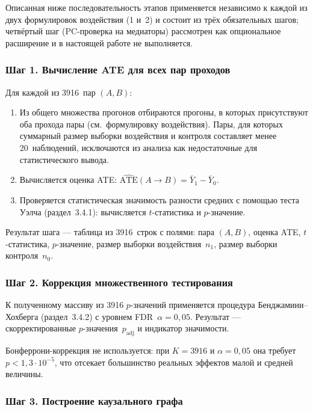 Описанная ниже последовательность этапов применяется независимо к каждой из двух формулировок воздействия (1 и~2) и состоит из трёх обязательных шагов; четвёртый шаг (PC-проверка на медиаторы) рассмотрен как опциональное расширение и в настоящей работе не выполняется.

\subsubsection{Шаг 1. Вычисление ATE для всех пар проходов}

Для каждой из 3916~пар $(A, B)$:

\begin{enumerate}
    \item Из общего множества прогонов отбираются прогоны, в которых присутствуют оба прохода пары (см.~формулировку воздействия). Пары, для которых суммарный размер выборки воздействия и контроля составляет менее 20~наблюдений, исключаются из анализа как недостаточные для статистического вывода.
    \item Вычисляется оценка ATE: $\widehat{\text{ATE}}(A \to B) = \bar{Y}_1 - \bar{Y}_0$.
    \item Проверяется статистическая значимость разности средних с помощью теста Уэлча (раздел~3.4.1): вычисляется $t$-статистика и $p$-значение.
\end{enumerate}

Результат шага --- таблица из 3916~строк с полями: пара $(A, B)$, оценка ATE, $t$-статистика, $p$-значение, размер выборки воздействия~$n_1$, размер выборки контроля~$n_0$.

\subsubsection{Шаг 2. Коррекция множественного тестирования}

К полученному массиву из 3916 $p$-значений применяется процедура Бенджамини--Хохберга (раздел~3.4.2) с уровнем FDR~$\alpha = 0{,}05$. Результат --- скорректированные $p$-значения~$p_{\text{adj}}$ и индикатор значимости.

Бонферрони-коррекция не используется: при $K = 3916$ и $\alpha = 0{,}05$ она требует $p < 1{,}3 \cdot 10^{-5}$, что отсекает большинство реальных эффектов малой и средней величины.

\subsubsection{Шаг 3. Построение каузального графа}

